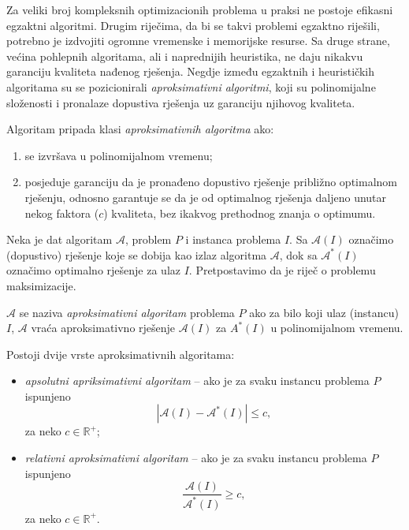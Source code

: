 \documentclass[a4paper, utf8, 11pt, colorlinks]{book}
\theoremstyle{definition}
\begin{document}
   Za veliki broj kompleksnih optimizacionih problema u praksi ne postoje efikasni egzaktni algoritmi. Drugim riječima, da bi se takvi problemi egzaktno riješili, potrebno je izdvojiti ogromne vremenske i memorijske resurse. Sa druge strane, većina pohlepnih algoritama, ali i naprednijih heuristika, ne daju nikakvu garanciju  kvaliteta nađenog rješenja. Negdje između egzaktnih i heurističkih algoritama su se pozicionirali \emph{aproksimativni algoritmi}, koji su polinomijalne složenosti i pronalaze dopustiva rješenja uz garanciju  njihovog kvaliteta. 
  
  \noindent Algoritam pripada klasi \emph{aproksimativnih algoritma} ako:
  \begin{enumerate}
  	\item se izvršava u polinomijalnom vremenu;
  	\item posjeduje garanciju da je pronađeno dopustivo rješenje približno optimalnom rješenju, odnosno garantuje se da je od optimalnog rješenja daljeno unutar nekog faktora ($c$) kvaliteta, bez ikakvog prethodnog znanja o optimumu.
  \end{enumerate}
  Neka je dat algoritam $\mathcal{A}$, problem $P$ i instanca problema $I$. Sa $\mathcal{A}(I)$ označimo (dopustivo) rješenje koje se dobija kao izlaz algoritma $\mathcal{A}$, dok sa $\mathcal{A}^*(I)$ označimo optimalno rješenje za ulaz $I$. Pretpostavimo da je riječ o problemu maksimizacije. 
  
  $\mathcal{A}$ se naziva \emph{aproksimativni algoritam} problema $P$ ako 
  za bilo koji ulaz (instancu) $I$, $\mathcal{A}$ vraća aproksimativno rješenje $\mathcal{A}(I)$ za $A^*(I)$ u polinomijalnom vremenu. 
  
  Postoji dvije vrste aproksimativnih algoritama:
  \begin{itemize}
  	\item \emph{apsolutni apriksimativni algoritam} -- ako je za svaku instancu problema $P$ ispunjeno
  	$$ |\mathcal{A}(I) - \mathcal{A}^*(I)| \leq c,$$ za neko $c\in \mathbb{R}^+$;
  	\item \emph{relativni aproksimativni algoritam} -- ako je   za svaku instancu problema $P$ ispunjeno
  	$$\frac{\mathcal{A}(I)}{\mathcal{A}^*(I)} \geq c,$$ za neko $c\in \mathbb{R}^+$.
  \end{itemize}
  
  
\end{document}
